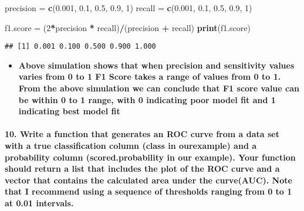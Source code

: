 \documentclass[]{article}
\newenvironment{Shaded}{\begin{snugshade}}{\end{snugshade}}
\newcommand{\DecValTok}[1]{\textcolor[rgb]{0.00,0.00,0.81}{#1}}
\newcommand{\FloatTok}[1]{\textcolor[rgb]{0.00,0.00,0.81}{#1}}
\newcommand{\KeywordTok}[1]{\textcolor[rgb]{0.13,0.29,0.53}{\textbf{#1}}}
\newcommand{\NormalTok}[1]{#1}
\newcommand{\OperatorTok}[1]{\textcolor[rgb]{0.81,0.36,0.00}{\textbf{#1}}}
\newcommand{\StringTok}[1]{\textcolor[rgb]{0.31,0.60,0.02}{#1}}
\providecommand{\tightlist}{%
  \setlength{\itemsep}{0pt}\setlength{\parskip}{0pt}}
\let\oldparagraph\paragraph
\renewcommand{\paragraph}[1]{\oldparagraph{#1}\mbox{}}
\begin{document}
\begin{Shaded}
\begin{Highlighting}[]
\NormalTok{precision =}\StringTok{ }\KeywordTok{c}\NormalTok{(}\FloatTok{0.001}\NormalTok{, }\FloatTok{0.1}\NormalTok{, }\FloatTok{0.5}\NormalTok{, }\FloatTok{0.9}\NormalTok{, }\DecValTok{1}\NormalTok{)}
\NormalTok{recall =}\StringTok{ }\KeywordTok{c}\NormalTok{(}\FloatTok{0.001}\NormalTok{, }\FloatTok{0.1}\NormalTok{, }\FloatTok{0.5}\NormalTok{, }\FloatTok{0.9}\NormalTok{, }\DecValTok{1}\NormalTok{)}

\NormalTok{f1.score =}\StringTok{ }\NormalTok{(}\DecValTok{2}\OperatorTok{*}\NormalTok{precision }\OperatorTok{*}\StringTok{ }\NormalTok{recall)}\OperatorTok{/}\NormalTok{(precision }\OperatorTok{+}\StringTok{ }\NormalTok{recall)}
\KeywordTok{print}\NormalTok{(f1.score)}
\end{Highlighting}
\end{Shaded}

\begin{verbatim}
## [1] 0.001 0.100 0.500 0.900 1.000
\end{verbatim}

\begin{itemize}
\tightlist
\item
  \textbf{Above simulation shows that when precision and sensitivity
  values varies from 0 to 1 F1 Score takes a range of values from 0 to
  1. From the above simulation we can conclude that F1 score value can
  be within 0 to 1 range, with 0 indicating poor model fit and 1
  indicating best model fit}
\end{itemize}

\hypertarget{write-a-function-that-generates-an-roc-curve-from-a-data-set-with-a-true-classification-column-class-in-ourexample-and-a-probability-column-scored.probability-in-our-example.-your-function-should-return-a-list-that-includes-the-plot-of-the-roc-curve-and-a-vector-that-contains-the-calculated-area-under-the-curveauc.-note-that-i-recommend-using-a-sequence-of-thresholds-ranging-from-0-to-1-at-0.01-intervals.}{%
\paragraph{10. Write a function that generates an ROC curve from a data
set with a true classification column (class in ourexample) and a
probability column (scored.probability in our example). Your function
should return a list that includes the plot of the ROC curve and a
vector that contains the calculated area under the curve(AUC). Note that
I recommend using a sequence of thresholds ranging from 0 to 1 at 0.01
intervals.}\label{write-a-function-that-generates-an-roc-curve-from-a-data-set-with-a-true-classification-column-class-in-ourexample-and-a-probability-column-scored.probability-in-our-example.-your-function-should-return-a-list-that-includes-the-plot-of-the-roc-curve-and-a-vector-that-contains-the-calculated-area-under-the-curveauc.-note-that-i-recommend-using-a-sequence-of-thresholds-ranging-from-0-to-1-at-0.01-intervals.}}
\end{document}
